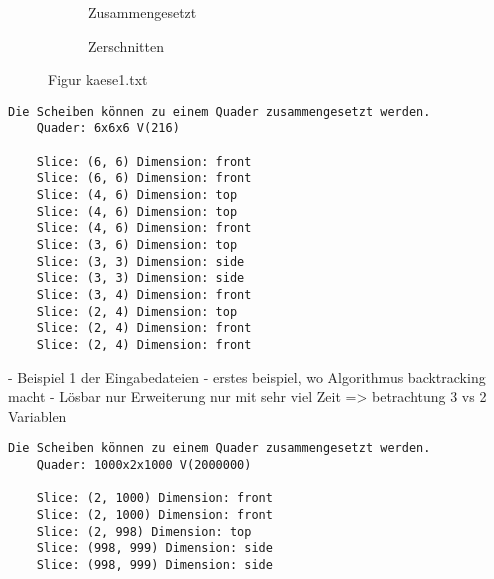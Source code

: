 \documentclass[a4paper,10pt,ngerman]{scrartcl}
\newcommand{\simplecube}[8]%
{
    \begin{scope}[shift={#1}]
        \fill[gray!40,canvas is yz plane at x=#2, opacity=#8] (0,0) rectangle (#3,#4);
        \fill[gray!10,canvas is xz plane at y=#3, opacity=#8] (0,0) rectangle (#2,#4);
        \fill[white  ,canvas is xy plane at z=#4, opacity=#8] (0,0) rectangle (#2,#3);
        \foreach\i/\j in {0/1, 1/1, 1/0}
            {
            \draw[line#5] (0,#3*\i,#4*\j) --++ (#2,0,0);
            \draw[line#6] (#2*\i,0,#4*\j) --++ (0,#3,0);
            \draw[line#7] (#2*\i,#3*\j,0) --++ (0,0,#4);
        }
    \end{scope}
}
\newcommand{\bigSquare}[4]%
{
    \begin{scope}[shift={#1}]
        \simplecube{(0,     0,      0)}     {1}{4}{2}   {a}{a}{a}   {1}
        \simplecube{(1+#4,   0,      0))}    {1}{4}{2}   {a}{a}{a}   {1}
        \simplecube{(0,     0,      2+#4)}   {2}{4}{1}   {a}{a}{a}   {1}
        \simplecube{(2+2*#4,   0,      0)}     {1}{4}{3}   {a}{a}{a}   {0.8}
        \simplecube{(0,     4+#4,    0)}     {3}{1}{3}   {a}{a}{a}   {0.8}
        \simplecube{(0,     5+2*#4,    0)}     {3}{1}{3}   {a}{a}{a}   {0.5}
        \simplecube{(0,     0,      3+2*#4)}   {3}{6}{1}   {a}{a}{a}   {0.8}
        \simplecube{(3+3*#4,   0,      0))}    {1}{6}{4}   {a}{a}{a}   {0.5}
        \simplecube{(0,     0,      4+3*#4)}   {4}{6}{1}   {a}{a}{a}   {0.5}
        \simplecube{(0,     0,      5+4*#4)}   {4}{6}{1}   {a}{a}{a}   {0.2}
        \simplecube{(4+4*#4,   0,      0))}    {1}{6}{6}   {a}{a}{a}   {0.2}
        \simplecube{(5+5*#4,   0,      0))}    {1}{6}{6}   {a}{a}{a}   {0}
    \end{scope}
}
\begin{document}
    \begin{figure}[H]
        \centering
        \def\a{3.2}
        \def\b{1.2}
        \begin{subfigure}[b]{0.45\textwidth}
            \centering %
            \caption{Zusammengesetzt}\label{fig:figA1}
        \end{subfigure}
        \begin{subfigure}[b]{0.45\textwidth}
            \centering %
            \caption{Zerschnitten}\label{fig:figB1}
        \end{subfigure}
        \caption{Figur kaese1.txt}\label{fig:figAB1}
    \end{figure}

    \begin{lstlisting}[frame=single, title=Programmausgabe kaese1.txt, breaklines=true,label={lst:lstlisting6}]
    Die Scheiben können zu einem Quader zusammengesetzt werden.
    Quader: 6x6x6 V(216)

    Slice: (6, 6) Dimension: front
    Slice: (6, 6) Dimension: front
    Slice: (4, 6) Dimension: top
    Slice: (4, 6) Dimension: top
    Slice: (4, 6) Dimension: front
    Slice: (3, 6) Dimension: top
    Slice: (3, 3) Dimension: side
    Slice: (3, 3) Dimension: side
    Slice: (3, 4) Dimension: front
    Slice: (2, 4) Dimension: top
    Slice: (2, 4) Dimension: front
    Slice: (2, 4) Dimension: front
    \end{lstlisting}

    - Beispiel 1 der Eingabedateien
    - erstes beispiel, wo Algorithmus backtracking macht
    - Lösbar nur Erweiterung nur mit sehr viel Zeit
    => betrachtung 3 vs 2 Variablen

    \begin{lstlisting}[frame=single, title=Programmausgabe kaese2.txt, breaklines=true,label={lst:lstlisting7}]
    Die Scheiben können zu einem Quader zusammengesetzt werden.
    Quader: 1000x2x1000 V(2000000)

    Slice: (2, 1000) Dimension: front
    Slice: (2, 1000) Dimension: front
    Slice: (2, 998) Dimension: top
    Slice: (998, 999) Dimension: side
    Slice: (998, 999) Dimension: side
    \end{lstlisting}
\end{document}
